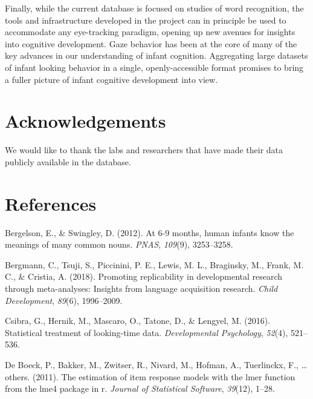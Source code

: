 \documentclass[10pt, letterpaper]{article}
\begin{document}
Finally, while the current database is focused on studies of word
recognition, the tools and infrastructure developed in the project can
in principle be used to accommodate any eye-tracking paradigm, opening
up new avenues for insights into cognitive development. Gaze behavior
has been at the core of many of the key advances in our understanding of
infant cognition. Aggregating large datasets of infant looking behavior
in a single, openly-accessible format promises to bring a fuller picture
of infant cognitive development into view.

\hypertarget{acknowledgements}{%
\section{Acknowledgements}\label{acknowledgements}}

We would like to thank the labs and researchers that have made their
data publicly available in the database.

\hypertarget{references}{%
\section{References}\label{references}}

\setlength{\parindent}{-0.1in} 
\setlength{\leftskip}{0.125in}

\noindent

\hypertarget{refs}{}
\leavevmode\hypertarget{ref-Bergelson2012a}{}%
Bergelson, E., \& Swingley, D. (2012). At 6-9 months, human infants know
the meanings of many common nouns. \emph{PNAS}, \emph{109}(9),
3253--3258.

\leavevmode\hypertarget{ref-Bergmann2018}{}%
Bergmann, C., Tsuji, S., Piccinini, P. E., Lewis, M. L., Braginsky, M.,
Frank, M. C., \& Cristia, A. (2018). Promoting replicability in
developmental research through meta-analyses: Insights from language
acquisition research. \emph{Child Development}, \emph{89}(6),
1996--2009.

\leavevmode\hypertarget{ref-Csibra2016}{}%
Csibra, G., Hernik, M., Mascaro, O., Tatone, D., \& Lengyel, M. (2016).
Statistical treatment of looking-time data. \emph{Developmental
Psychology}, \emph{52}(4), 521--536.

\leavevmode\hypertarget{ref-de-boeck2011}{}%
De Boeck, P., Bakker, M., Zwitser, R., Nivard, M., Hofman, A.,
Tuerlinckx, F., \ldots{} others. (2011). The estimation of item response
models with the lmer function from the lme4 package in r. \emph{Journal
of Statistical Software}, \emph{39}(12), 1--28.
\end{document}
